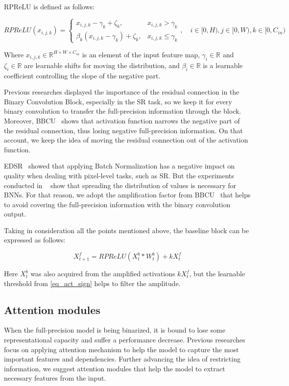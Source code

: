 \documentclass{article}
\begin{document}
RPReLU is defined as follows:

\begin{equation}
    RPReLU(x_{i, j, k}) = 
    \begin{cases}
        x_{i, j, k} - \gamma_{k} + \zeta_{k}, & x_{i, j, k} > \gamma_{k} \\
        \beta_k(x_{i, j, k} - \gamma_k) + \zeta_k, & x_{i, j, k} \le \gamma_k
    \end{cases}, \quad
    i \in [0, H), j \in [0, W), k \in [0, C_{in})
\end{equation}

Where $x_{i, j, k} \in \mathbb{R}^{H \times W \times C_{in}}$ is an element of the input feature map, $\gamma_i \in \mathbb{R}$ and $\zeta_i \in \mathbb{R}$ are learnable shifts for moving the distribution, and $\beta_i \in \mathbb{R}$ is a learnable coefficient controlling the slope of the negative part.

Previous researches displayed the importance of the residual connection in the Binary Convolution Block, especially in the SR task, so we keep it for every binary convolution to transfer the full-precision information through the block. Moreover, BBCU~\cite{xia2022basic} shows that activation function narrows the negative part of the residual connection, thus losing negative full-precision information. On that account, we keep the idea of moving the residual connection out of the activation function.

EDSR~\cite{lim2017enhanced} showed that applying Batch Normalization has a negative impact on quality when dealing with pixel-level tasks, such as SR. But the experiments conducted in ~\cite{xia2022basic} show that spreading the distribution of values is necessary for BNNs. For that reason, we adopt the amplification factor from BBCU~\cite{xia2022basic} that helps to avoid covering the full-precision information with the binary convolution output. 

Taking in consideration all the points mentioned above, the baseline block can be expressed as follows:

\begin{equation}
    X_{t+1}^f = RPReLU(X_{t}^b \ast W_t^b) + kX_t^f
\end{equation}

Here $X_{t}^b$ was also acquired from the amplified activations $kX_t^f$, but the learnable threshold from \ref{eq_act_sign} helps to filter the amplitude. 

\subsection{Attention modules}
When the full-precision model is being binarized, it is bound to lose some representational capacity and suffer a performance decrease. Previous researches~\cite{guo2022join, xue2022ir2net} focus on applying attention mechanism to help the model to capture the most important features and dependencies. Further advancing the idea of restricting information, we suggest attention modules that help the model to extract necessary features from the input. 
\end{document}
